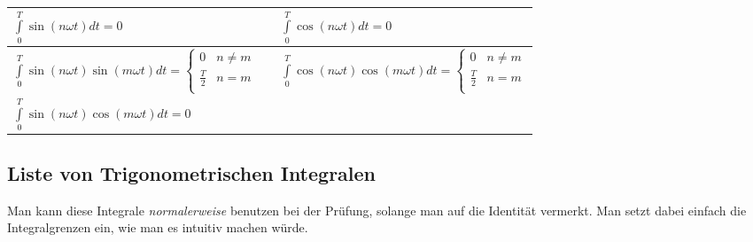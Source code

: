\begin{multicols*}{2}
    \begin{center}
        \begin{tabular}{l c l} \toprule
            $\displaystyle\int\limits_0^T \sin(n \omega t) dt = 0$                             & \hspace*{+20pt} &
            $\displaystyle\int\limits_0^T \cos(n \omega t) dt = 0$                                                                                                                                                         \\
            \midrule
            $\displaystyle\int\limits_0^T \sin(n \omega t) \sin(m \omega t) dt = \begin{cases}
                                                                                         0 & n \neq m \\ \frac{T}{2} & n = m \\
                                                                                     \end{cases}$ & \hspace*{+20pt} & $\displaystyle\int\limits_0^T \cos(n \omega t) \cos(m \omega t) dt = \begin{cases}
                                                                                                                                                                                               0 & n \neq m \\ \frac{T}{2} & n = m \\
                                                                                                                                                                                           \end{cases}$ \\
            \midrule
            $\displaystyle\int\limits_0^T \sin(n \omega t) \cos(m \omega t) dt = 0$                                                                                                                                        \\
            \toprule
        \end{tabular}
    \end{center}
    \vfill\null
    \columnbreak

    \subsection{Liste von Trigonometrischen Integralen}

    Man kann diese Integrale \emph{normalerweise} benutzen bei der Prüfung, solange man auf die Identität vermerkt. Man setzt dabei einfach die Integralgrenzen ein, wie man es intuitiv machen würde.


\end{multicols*}
